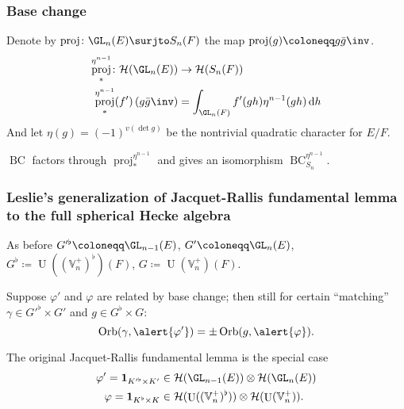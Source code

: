 \documentclass[11pt]{beamer}
\DeclareMathOperator{\BC}{BC}
\DeclareMathOperator{\Orb}{Orb}
\DeclareMathOperator{\Sat}{Satake}
\DeclareMathOperator{\U}{U}
\DeclareMathOperator{\rproj}{proj}
\newcommand{\HH}{\mathcal{H}}
\newcommand{\VV}{\mathbb{V}}
\begin{document}
\begin{frame}[fragile]
  \frametitle{Base change}
  Denote by $\rproj \colon \GL_n(E) \surjto S_n(F)$ the map $\rproj(g) \coloneqq g \bar{g}\inv$.
  \begin{align*}
    \rproj^{\eta^{n-1}}_\ast \colon \HH(\GL_n(E)) &\to \HH(S_n(F)) \\
    \rproj^{\eta^{n-1}}_\ast(f')\left( g\bar{g}\inv \right) &= \int_{\GL_n(F)} f'(gh) \eta^{n-1}(gh) \odif h
  \end{align*}
  And let $\eta(g) = (-1)^{v(\det g)}$ be the nontrivial quadratic character for $E/F$.
  \begin{center}
  \end{center}
  \begin{theorem}
    [Leslie 2023]
    $\BC$ factors through $\rproj_\ast^{\eta^{n-1}}$
    and gives an isomorphism $\BC_{S_n}^{\eta^{n-1}}$.
  \end{theorem}
\end{frame}


\begin{frame}
  \frametitle{Leslie's generalization of Jacquet-Rallis fundamental lemma to the full spherical Hecke algebra}
  As before $G'^\flat \coloneqq \GL_{n-1}(E)$, $G' \coloneqq \GL_n(E)$,
  $G^\flat \coloneqq \U((\VV_n^+)^\flat)(F)$, $G \coloneqq \U(\VV_n^+)(F)$.

  \begin{theorem}[Leslie 2023]
    Suppose \alert{$\varphi'$ and $\varphi$ are related by base change}; then still
    for certain ``matching'' $\gamma \in G'^\flat \times G'$ and $g \in G^\flat \times G$:
    \[ \Orb(\gamma, \alert{\varphi'}) = \pm \Orb(g, \alert{\varphi}). \]
  \end{theorem}

  The original Jacquet-Rallis fundamental lemma is the special case
  \begin{align*}
    \varphi' = \mathbf{1}_{K'^\flat \times K'} &\in \HH(\GL_{n-1}(E)) \otimes \HH(\GL_n(E)) \\
    \varphi = \mathbf{1}_{K^\flat \times K} &\in \HH(\U((\VV_n^+)^\flat)) \otimes \HH(\U(\VV_n^+)).
  \end{align*}
\end{frame}
\end{document}
